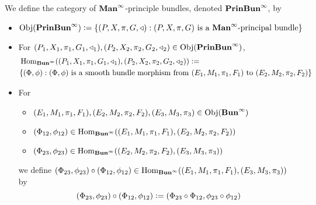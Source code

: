 \documentclass{book}
\begin{document}
\begin{defn} 
	We define the category of $\operatorname*{\text{\textbf{Man}}^{\infty}}$-principle bundles, denoted $\operatorname*{\text{\textbf{PrinBun}}^{\infty}}$, by 
	\begin{itemize}
		\item $\operatorname{Obj}(\operatorname*{\text{\textbf{PrinBun}}^{\infty}}) \vcentcolon= \{(P, X, \pi, G, \triangleleft): (P, X, \pi, G) \text{ is a $\operatorname*{\text{\textbf{Man}}^{\infty}}$-principal bundle}\}$ 
		\item For $(P_1, X_1, \pi_1, G_1, \triangleleft_1), (P_2, X_2, \pi_2, G_2, \triangleleft_2) \in \operatorname{Obj}(\operatorname*{\text{\textbf{PrinBun}}^{\infty}})$, 
		\begin{align*}
			& \operatorname{Hom}_{\operatorname*{\text{\textbf{Bun}}^{\infty}}}((P_1, X_1, \pi_1, G_1, \triangleleft_1), (P_2, X_2, \pi_2, G_2, \triangleleft_2)) \vcentcolon= \\
			& \{(\Phi, \phi): (\Phi, \phi) \text{ is a smooth bundle morphism from $(E_1, M_1, \pi_1, F_1)$ to $(E_2, M_2, \pi_2, F_2)$} \}
		\end{align*}
		\item For 
		\begin{itemize}
			\item $(E_1, M_1, \pi_1, F_1), (E_2, M_2, \pi_2, F_2), (E_3, M_3, \pi_3) \in \operatorname{Obj}(\operatorname*{\text{\textbf{Bun}}^{\infty}})$ 
			\item $(\Phi_{12}, \phi_{12}) \in \operatorname{Hom}_{\operatorname*{\text{\textbf{Bun}}^{\infty}}}((E_1, M_1, \pi_1, F_1), (E_2, M_2, \pi_2, F_2))$
			\item $(\Phi_{23}, \phi_{23}) \in \operatorname{Hom}_{\operatorname*{\text{\textbf{Bun}}^{\infty}}}((E_2, M_2, \pi_2, F_2), (E_3, M_3, \pi_3))$ 
		\end{itemize}
		we define $(\Phi_{23}, \phi_{23}) \circ (\Phi_{12}, \phi_{12}) \in \operatorname{Hom}_{\operatorname*{\text{\textbf{Bun}}^{\infty}}}((E_1, M_1, \pi_1, F_1), (E_3, M_3, \pi_3))$ by 
		$$(\Phi_{23}, \phi_{23}) \circ (\Phi_{12}, \phi_{12}) \vcentcolon= (\Phi_{23} \circ \Phi_{12}, \phi_{23} \circ \phi_{12})$$
	\end{itemize}

\end{defn}
\end{document}
